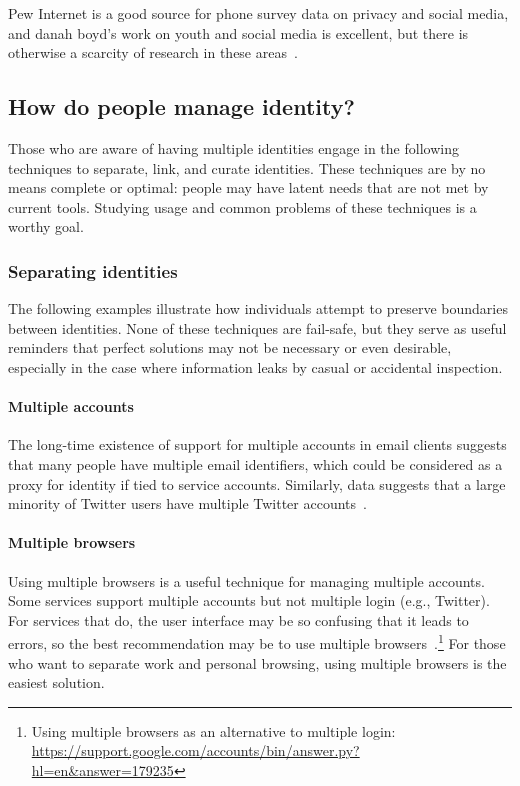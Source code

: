 \documentclass[10pt, conference, compsocconf]{IEEEtran}
\begin{document}
Pew Internet is a good source for phone survey data on privacy and social
media, and danah boyd's work on youth and social media is excellent, but there
is otherwise a scarcity of research in these areas~\cite{boyd,pew1,pew2,pew3}.

\subsection{How do people manage identity?}

Those who are aware of having multiple identities engage in the following
techniques to separate, link, and curate identities. These techniques are by no
means complete or optimal: people may have latent needs that are not met
by current tools. Studying usage and common problems of these techniques is a
worthy goal.

\subsubsection{Separating identities}

The following examples illustrate how individuals attempt to preserve boundaries
between identities. None of these techniques are fail-safe, but they serve as
useful reminders that perfect solutions may not be necessary or even desirable,
especially in the case where information leaks by casual or accidental
inspection.

\paragraph{Multiple accounts}
The long-time existence of support for multiple accounts in email clients
suggests that many people have multiple email identifiers, which could be
considered as a proxy for identity if tied to service accounts. Similarly, data
suggests that a large minority of Twitter users have multiple Twitter
accounts~\cite{twitter}.

\paragraph{Multiple browsers}

Using multiple browsers is a useful technique for managing multiple accounts.
Some services support multiple accounts but not multiple login (e.g.,
Twitter). For services that do, the user interface
may be so confusing that it leads to errors, so the best recommendation may be
to use multiple browsers~\cite{yegge}.\footnote{Using multiple
browsers as an alternative to multiple login:
\url{https://support.google.com/accounts/bin/answer.py?hl=en&answer=179235}}
For those who want to separate work and
personal browsing, using multiple browsers is the easiest solution.
\end{document}
